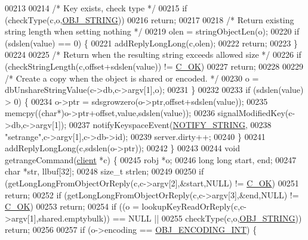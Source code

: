 \begin{DoxyCode}
{00213 
00214         \textcolor{comment}{/* Key exists, check type */}
00215         \textcolor{keywordflow}{if} (checkType(c,o,\hyperlink{server_8h_a65236ea160f69cdef33ec942092af88f}{OBJ\_STRING}))
00216             \textcolor{keywordflow}{return};
00217 
00218         \textcolor{comment}{/* Return existing string length when setting nothing */}
00219         olen = stringObjectLen(o);
00220         \textcolor{keywordflow}{if} (sdslen(value) == 0) \{
00221             addReplyLongLong(c,olen);
00222             \textcolor{keywordflow}{return};
00223         \}
00224 
00225         \textcolor{comment}{/* Return when the resulting string exceeds allowed size */}
00226         \textcolor{keywordflow}{if} (checkStringLength(c,offset+sdslen(value)) != \hyperlink{server_8h_a303769ef1065076e68731584e758d3e1}{C\_OK})
00227             \textcolor{keywordflow}{return};
00228 
00229         \textcolor{comment}{/* Create a copy when the object is shared or encoded. */}
00230         o = dbUnshareStringValue(c->db,c->argv[1],o);
00231     \}
00232 
00233     \textcolor{keywordflow}{if} (sdslen(value) > 0) \{
00234         o->ptr = sdsgrowzero(o->ptr,offset+sdslen(value));
00235         memcpy((\textcolor{keywordtype}{char}*)o->ptr+offset,value,sdslen(value));
00236         signalModifiedKey(c->db,c->argv[1]);
00237         notifyKeyspaceEvent(\hyperlink{server_8h_a1902292b73b71baa65d86db2d61b47ce}{NOTIFY\_STRING},
00238             \textcolor{stringliteral}{"setrange"},c->argv[1],c->db->id);
00239         server.dirty++;
00240     \}
00241     addReplyLongLong(c,sdslen(o->ptr));
00242 \}
00243 
00244 \textcolor{keywordtype}{void} getrangeCommand(\hyperlink{structclient}{client} *c) \{
00245     robj *o;
00246     \textcolor{keywordtype}{long} \textcolor{keywordtype}{long} start, end;
00247     \textcolor{keywordtype}{char} *str, llbuf[32];
00248     size\_t strlen;
00249 
00250     \textcolor{keywordflow}{if} (getLongLongFromObjectOrReply(c,c->argv[2],&start,NULL) != \hyperlink{server_8h_a303769ef1065076e68731584e758d3e1}{C\_OK})
00251         \textcolor{keywordflow}{return};
00252     \textcolor{keywordflow}{if} (getLongLongFromObjectOrReply(c,c->argv[3],&end,NULL) != \hyperlink{server_8h_a303769ef1065076e68731584e758d3e1}{C\_OK})
00253         \textcolor{keywordflow}{return};
00254     \textcolor{keywordflow}{if} ((o = lookupKeyReadOrReply(c,c->argv[1],shared.emptybulk)) == NULL ||
00255         checkType(c,o,\hyperlink{server_8h_a65236ea160f69cdef33ec942092af88f}{OBJ\_STRING})) \textcolor{keywordflow}{return};
00256 
00257     \textcolor{keywordflow}{if} (o->encoding == \hyperlink{server_8h_ae934cf008a0be0ef009c92c2d006a816}{OBJ\_ENCODING\_INT}) \{
}
\end{DoxyCode}

